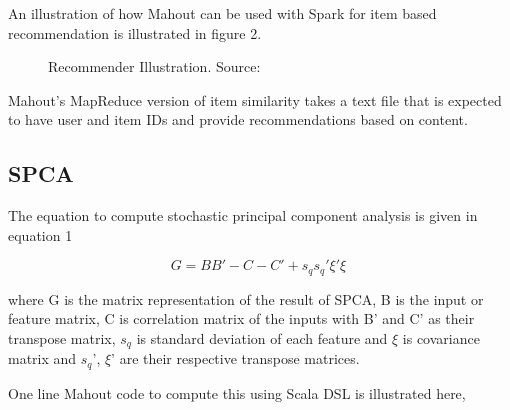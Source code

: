 \documentclass[9pt,twocolumn,twoside]{../../styles/osajnl}
\begin{document}
An illustration of how Mahout can be used with Spark for item based
recommendation is illustrated in figure 2.

\begin{figure}[htbp]
\centering
{}
\caption{Recommender Illustration. \newline Source: \cite{www-recommendations}}
\label{fig:false-color}
\end{figure}

Mahout's MapReduce version of item similarity takes a text file that is
expected to have user and item IDs and provide recommendations based
on content.

\subsection{SPCA}
The equation to compute stochastic principal component analysis is
given in equation 1

\begin{equation}
G=B{B}' - C - {C}' + s_{q} {s_{q}}' {\xi}' \xi\
\label{equation1}
\end{equation}

where G is the matrix representation of the result of SPCA, B is the
input or feature matrix, C is correlation matrix of the inputs with B'
and C' as their transpose matrix, $s_q$ is standard deviation of each
feature and $\xi$ is covariance matrix and $s_q$', $\xi$' are their
respective transpose matrices.  

One line Mahout code to compute this using Scala DSL is illustrated
here,
\end{document}
